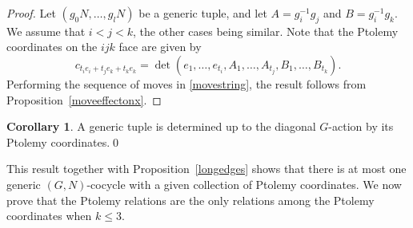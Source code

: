 \documentclass[11pt]{amsart}
\theoremstyle{definition}
\newtheorem{corollary}[theorem]{Corollary}
\numberwithin{equation}{section}
\begin{document}
\begin{proof} 
Let $(g_0N,\dots,g_lN)$ be a generic tuple, and let $A=g_i^{-1}g_j$ and $B=g_i^{-1}g_k$.
We assume that $i<j<k$, the other cases being similar. Note that the Ptolemy coordinates on the $ijk$ face are given by 
\begin{equation}
c_{t_ie_i+t_je_k+t_ke_k}=\det(e_1,\dots,e_{t_i},A_1,\dots,A_{t_j},B_1,\dots,B_{t_k}).
\end{equation}
Performing the sequence of moves in \eqref{movestring}, the result follows from Proposition~\ref{moveeffectonx}. 
\end{proof}


\begin{corollary}
A generic tuple is determined up to the diagonal $G$-action by its Ptolemy coordinates.\qed
\end{corollary}

This result together with Proposition~\ref{longedges} shows that there is at most one generic $(G,N)$-cocycle with a given collection of Ptolemy coordinates. We now prove that the Ptolemy relations are the only relations among the Ptolemy coordinates when $k\leq 3$.
\end{document}
